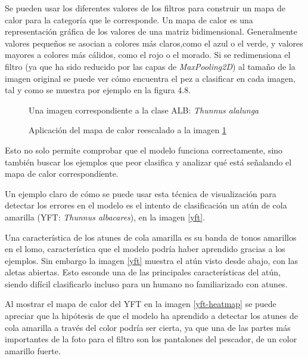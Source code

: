 Se pueden usar los diferentes valores de los filtros para construir un mapa de calor para la categoría que le corresponde. Un mapa de calor es una representación gráfica de los valores de una matriz bidimensional. Generalmente valores pequeños se asocian a colores más claros,como el azul o el verde, y valores mayores a colores más cálidos, como el rojo o el morado.  Si se redimensiona el filtro (ya que ha sido reducido por las capas de \textit{MaxPooling2D}) al tamaño de la imagen original se puede ver cómo encuentra el pez a clasificar en cada imagen, tal y como se muestra por ejemplo en la figura 4.8.

\begin{figure}
    \caption{Una imagen correspondiente a la clase ALB: \textit{Thunnus alalunga}}
\label{fc-fish}
\end{figure}

\begin{figure}
    \caption{Aplicación del mapa de calor reescalado a la imagen \ref{fc-fish}}
\label{fc-heatmap}
\end{figure}

Esto no solo permite comprobar que el modelo funciona correctamente, sino también buscar los ejemplos que peor clasifica y analizar qué está señalando el mapa de calor correspondiente.

Un ejemplo claro de cómo se puede usar esta técnica de visualización para detectar los errores en el modelo es el intento de clasificación un atún de cola amarilla (YFT: \textit{Thunnus albacares}), en la imagen \ref{yft}.

Una característica de los atunes de cola amarilla es su banda de tonos amarillos en el lomo, característica que el modelo podría haber aprendido gracias a los ejemplos. Sin embargo la imagen \ref{yft} muestra el atún visto desde abajo, con las aletas abiertas. Esto esconde una de las principales características del atún, siendo difícil clasificarlo incluso para un humano no familiarizado con atunes.

Al mostrar el mapa de calor del YFT en la imagen \ref{yft-heatmap} se puede apreciar que la hipótesis de que el modelo ha aprendido a detectar los atunes de cola amarilla a través del color podría ser cierta, ya que una de las partes más importantes de la foto para el filtro son los pantalones del pescador, de un color amarillo fuerte.

